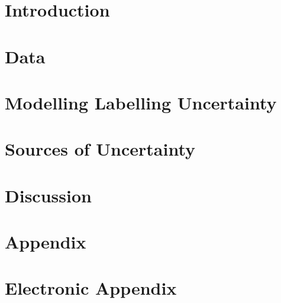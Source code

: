 \documentclass[12pt]{article}
\begin{document}
\listoftables


\newpage


    
\section{Introduction}
\label{intro}

\newpage

\section{Data}
\label{Data}

\newpage

\section{Modelling Labelling Uncertainty}
\label{uncertainty_estimation}

\newpage

\section{Sources of Uncertainty}
\label{uncertainty_sources}

\newpage

\section{Discussion}
\label{conclusion}


\newpage

    

\setcounter{page}{5} %

\appendix

\section{Appendix}
\label{app}

\newpage

\section{Electronic Appendix}
\label{el_app}
\end{document}
